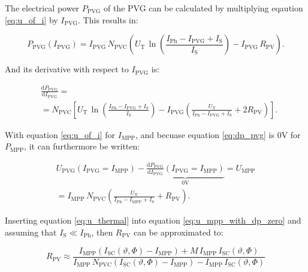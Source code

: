 The electrical power $P_\mathrm{PVG}$ of the PVG can be calculated by multiplying eqaution \ref{eq:u_of_i} by $I_\mathrm{PVG}$. This results in:
\begin{center}
	\begin{equation} \label{eq:p_pvg}
		 P_{\mathrm{PVG}}\left(I_{\mathrm{PVG}}\right) = I_{\mathrm{PVG}} \, N_{\mathrm{PVC}} \left( U_{\mathrm{T}} \, \ln \left( \frac{I_{\mathrm{Ph}} - I_{\mathrm{PVG}} + I_{\mathrm{S}}}{I_{\mathrm{S}}} \right) - I_{\mathrm{PVG}} \, R_{\mathrm{PV}} \right) \text{.}
	\end{equation}
\end{center}
And its derivative with respect to $I_{\mathrm{PVG}}$ is:
\begin{center}
	\begin{equation} \label{eq:dp_pvg}
		\begin{aligned}
			&\frac{\mathrm{d} P_{\mathrm{PVG}}}{\mathrm{d} I_{\mathrm{PVG}}} = \\
			& = N_{\mathrm{PVC}} \left[ U_{\mathrm{T}} \, \ln \left( \frac{I_{\mathrm{Ph}} - I_{\mathrm{PVG}} + I_{\mathrm{S}}}{I_{\mathrm{S}}} \right) - I_{\mathrm{PVG}} \left( \frac{U_{\mathrm{T}}}{I_{\mathrm{Ph}} - I_{\mathrm{PVG}} + I_{\mathrm{S}}} + 2 R_{\mathrm{PV}} \right) \right] \text{.}
		 \end{aligned}
	\end{equation}
\end{center}
With equation \ref{eq:u_of_i} for $I_\mathrm{MPP}$, and becuase equation \ref{eq:dp_pvg} is $0\mathrm{V}$ for $P_\mathrm{MPP}$, it can furthermore be written:
\begin{center}
	\begin{equation} \label{eq:u_mpp_with_dp_zero}
		\begin{gathered}
		 U_{\mathrm{PVG}}\left(I_{\mathrm{PVG}} = I_{\mathrm{MPP}}\right) - \underbrace{\frac{\mathrm{d} P_{\mathrm{PVG}}}{\mathrm{d} I_{\mathrm{PVG}}} \left( I_{\mathrm{PVG}} = I_{\mathrm{MPP}} \right)}_{0\mathrm{V}} = U_{\mathrm{MPP}} \\ = I_\mathrm{MPP} \, N_\mathrm{PVC} \left( \frac{U_\mathrm{T}}{I_\mathrm{Ph} - I_\mathrm{MPP} + I_\mathrm{S}} + R_\mathrm{PV} \right) \text{.}
		 \end{gathered}
	\end{equation}
\end{center}
Inserting equation \ref{eq:u_thermal} into equation \ref{eq:u_mpp_with_dp_zero} and assuming that $I_{\mathrm{S}} \ll I_{\mathrm{Ph}}$, then $R_\mathrm{PV}$ can be approximated to:
\begin{center}
	\begin{equation} \label{eq:r_pv}
		  R_\mathrm{PV} \approx \frac{I_\mathrm{MPP} \left( I_{\mathrm{SC}}\left(\vartheta,\Phi\right) - I_\mathrm{MPP}\right) + M \, I_\mathrm{MPP} \, I_{\mathrm{SC}}\left(\vartheta,\Phi\right)}{I_\mathrm{MPP} \, N_\mathrm{PVC} \left( I_{\mathrm{SC}}\left(\vartheta,\Phi\right) - I_\mathrm{MPP}\right) - I_\mathrm{MPP} \, I_{\mathrm{SC}}\left(\vartheta,\Phi\right) }
	\end{equation}
\end{center}

